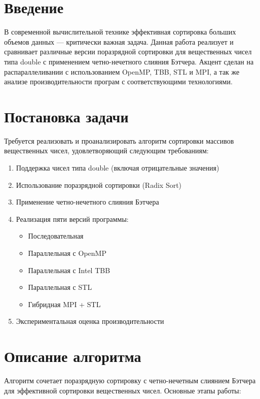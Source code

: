 \documentclass[12pt]{article}
\begin{document}
\newpage

\section*{Введение}

В современной вычислительной технике эффективная сортировка больших объемов данных — критически важная задача. Данная работа реализует и сравнивает различные версии поразрядной сортировки для вещественных чисел типа double с применением четно-нечетного слияния Бэтчера. Акцент сделан на распараллеливании с использованием OpenMP, TBB, STL и MPI, а так же анализе производительности програм с соответствующими технологиями.

\newpage

\section{Постановка задачи}
Требуется реализовать и проанализировать алгоритм сортировки массивов вещественных чисел, удовлетворяющий следующим требованиям:
\begin{enumerate}
    \item Поддержка чисел типа double (включая отрицательные значения)
    \item Использование поразрядной сортировки (Radix Sort) 
    \item Применение четно-нечетного слияния Бэтчера
    \item Реализация пяти версий программы:
    \begin{itemize}
        \item Последовательная
        \item Параллельная с OpenMP
        \item Параллельная с Intel TBB
        \item Параллельная с STL
        \item Гибридная MPI + STL
    \end{itemize}
    \item Экспериментальная оценка производительности
\end{enumerate}

\newpage

\section{Описание алгоритма}
Алгоритм сочетает поразрядную сортировку с четно-нечетным слиянием Бэтчера для эффективной сортировки вещественных чисел. Основные этапы работы:
\end{document}
